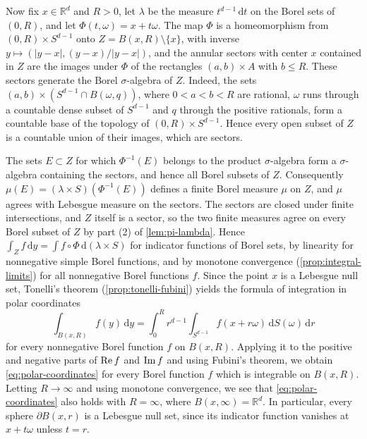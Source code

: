 Now fix $x\in\mathbb R^d$ and $R>0$, let $\lambda$ be the measure $t^{d-1}\,\mathrm dt$ on the Borel sets of $(0,R)$, and let $\Phi(t,\omega)=x+t\omega$. The map $\Phi$ is a homeomorphism from $(0,R)\times S^{d-1}$ onto $Z=B(x,R)\setminus\{x\}$, with inverse $y\mapsto(|y-x|,(y-x)/|y-x|)$, and the annular sectors with center $x$ contained in $Z$ are the images under $\Phi$ of the rectangles $(a,b)\times A$ with $b\leq R$. These sectors generate the Borel $\sigma$-algebra of $Z$. Indeed, the sets $(a,b)\times(S^{d-1}\cap B(\omega,q))$, where $0<a<b<R$ are rational, $\omega$ runs through a countable dense subset of $S^{d-1}$ and $q$ through the positive rationals, form a countable base of the topology of $(0,R)\times S^{d-1}$. Hence every open subset of $Z$ is a countable union of their images, which are sectors.

The sets $E\subset Z$ for which $\Phi^{-1}(E)$ belongs to the product $\sigma$-algebra form a $\sigma$-algebra containing the sectors, and hence all Borel subsets of $Z$. Consequently $\mu(E)=(\lambda\times S)(\Phi^{-1}(E))$ defines a finite Borel measure $\mu$ on $Z$, and $\mu$ agrees with Lebesgue measure on the sectors. The sectors are closed under finite intersections, and $Z$ itself is a sector, so the two finite measures agree on every Borel subset of $Z$ by part (2) of \cref{lem:pi-lambda}. Hence $\int_Zf\,\mathrm dy=\int f\circ\Phi\,\mathrm d(\lambda\times S)$ for indicator functions of Borel sets, by linearity for nonnegative simple Borel functions, and by monotone convergence (\cref{prop:integral-limits}) for all nonnegative Borel functions $f$. Since the point $x$ is a Lebesgue null set, Tonelli's theorem (\cref{prop:tonelli-fubini}) yields the formula of integration in polar coordinates
\begin{equation}\label{eq:polar-coordinates}
 \int_{B(x,R)}f(y)\,\mathrm d y
 =\int_0^R r^{d-1}\int_{S^{d-1}}f(x+r\omega)\,\mathrm d S(\omega)\,\mathrm d r
\end{equation}
for every nonnegative Borel function $f$ on $B(x,R)$. Applying it to the positive and negative parts of $\operatorname{Re} f$ and $\operatorname{Im} f$ and using Fubini's theorem, we obtain \eqref{eq:polar-coordinates} for every Borel function $f$ which is integrable on $B(x,R)$. Letting $R\to\infty$ and using monotone convergence, we see that \eqref{eq:polar-coordinates} also holds with $R=\infty$, where $B(x,\infty)=\mathbb R^d$. In particular, every sphere $\partial B(x,r)$ is a Lebesgue null set, since its indicator function vanishes at $x+t\omega$ unless $t=r$.

